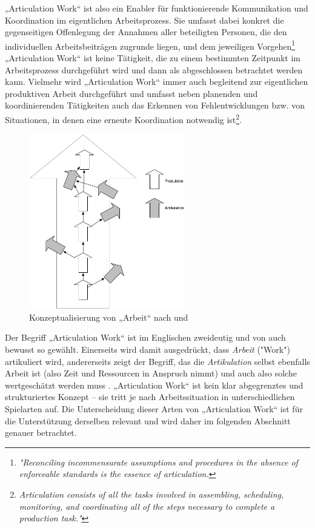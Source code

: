 „Articulation Work“ ist also ein Enabler für funktionierende Kommunikation und Koordination im eigentlichen Arbeitsprozess. Sie umfasst dabei konkret die gegenseitigen Offenlegung der Annahmen aller beteiligten Personen, die den individuellen Arbeitsbeiträgen zugrunde liegen, und dem jeweiligen Vorgehen\footnote{\emph{"Reconciling incommensurate assumptions and procedures in the absence of enforceable standards is the essence of articulation.}\citep{Gerson86}} „Articulation Work“ ist keine Tätigkeit, die zu einem bestimmten Zeitpunkt im Arbeitsprozess durchgeführt wird und dann als abgeschlossen betrachtet werden kann. Vielmehr wird „Articulation Work“ immer auch begleitend zur eigentlichen produktiven Arbeit durchgeführt und umfasst neben planenden und koordinierenden Tätigkeiten auch das Erkennen von Fehlentwicklungen bzw. von Situationen, in denen eine erneute  Koordination notwendig ist\footnote{\emph{Articulation consists of all the tasks involved in assembling, scheduling, monitoring, and coordinating all of the steps necessary to complete a production task."}\citep{Gerson86}}. 

\begin{figure}[htbp]
	\centering
		\includegraphics[height=3in]{img/ArticulationWork/ArtikulationProduktion.png}
	\caption{Konzeptualisierung von „Arbeit“ nach \citep{Strauss85} und \citep{Fujimura87}}
	\label{fig:img_ArticulationWork_ArtikulationProduktion}
\end{figure}

Der Begriff „Articulation Work“ ist im Englischen zweideutig und von \citeauthor{Strauss85} auch bewusst so gewählt. Einerseits wird damit ausgedrückt, dass \emph{Arbeit} ("Work") artikuliert wird, andererseits zeigt der Begriff, das die \emph{Artikulation} selbst ebenfalls Arbeit ist (also Zeit und Ressourcen in Anspruch nimmt) und auch also solche wertgeschätzt werden muss \citep{Fujimura87}. „Articulation Work“ ist kein klar abgegrenztes und strukturiertes Konzept – sie tritt je nach Arbeitssituation in unterschiedlichen Spielarten auf. Die Unterscheidung dieser Arten von „Articulation Work“ ist für die Unterstützung derselben relevant und wird daher im folgenden Abschnitt genauer betrachtet.

